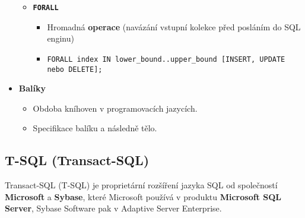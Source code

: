 \begin{itemize}
\begin{itemize}
\item \textbf{\texttt{FORALL}}
\begin{itemize}
\item Hromadná \textbf{operace} (navázání vstupní kolekce před posláním do SQL enginu)
\item \texttt{FORALL index IN lower\_bound..upper\_bound [INSERT, UPDATE nebo DELETE];}
\end{itemize}
\end{itemize}



\item\textbf{Balíky}
\begin{itemize}
\item Obdoba kníhoven v programovacích jazycích.
\item Specifikace balíku a následně tělo. 
\end{itemize}


\end{itemize}






\subsection{T-SQL (Transact-SQL)}
Transact-SQL (T-SQL) je proprietární rozšíření jazyka SQL od společností \textbf{Microsoft} a \textbf{Sybase}, které Microsoft používá v produktu \textbf{Microsoft SQL Server}, Sybase Software pak v Adaptive Server Enterprise.

